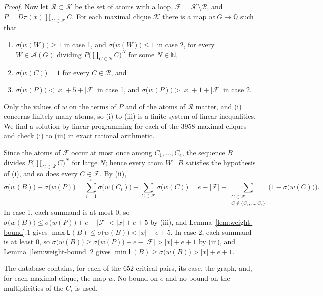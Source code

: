 \documentclass[a4paper, 10pt]{amsart}
\theoremstyle{plain}
\theoremstyle{definition}
\theoremstyle{definition}
\newcommand{\N}{\mathbb N}
\newcommand{\Q}{\mathbb Q}
\newcommand{\code}[1]{\texttt{\detokenize{#1}}}
\numberwithin{equation}{section}
\begin{document}
\begin{proof}
Now let $\mathcal R \subset \mathcal K$
be the set of atoms with a loop, $\mathcal F = \mathcal K \setminus \mathcal R$,
and $P = D\pi(x) \prod_{C \in \mathcal F} C$.  For each maximal clique
$\mathcal K$ there is a map $w \colon G \to \Q$ such that 
\begin{enumerate}
\item[(i)] $\sigma \big( w(W) \big) \ge 1$ in case 1, and $\sigma \big( w(W) \big) \le 1$ in case 2, for every
      $W \in \mathcal A (G)$ dividing $P \bigl(\prod_{C \in \mathcal R} C\bigr)^N$
      for some $N \in \N$,
\item[(ii)] $\sigma \big( w(C) \big) = 1$ for every $C \in \mathcal R$, and
\item[(iii)] $\sigma \big(w(P) \big) < |x|+5+|\mathcal F|$ in case 1, and
      $\sigma \big( w(P) \big) > |x|+1+|\mathcal F|$ in case 2.
\end{enumerate}
Only the values of $w$ on the terms of $P$ and of the atoms of $\mathcal R$
matter, and (i) concerns finitely many atoms, so (i) to (iii) is a finite
system of linear inequalities.  We find a solution by linear programming for
each of the $3958$ maximal cliques and check (i) to (iii) in exact rational
arithmetic.

Since the atoms of $\mathcal F$ occur at most once among
$C_1, \ldots, C_e$, the sequence $B$ divides
$P \bigl(\prod_{C \in \mathcal R} C\bigr)^N$ for large $N$; hence every atom
$W \mid B$ satisfies the hypothesis of (i), and so does every
$C \in \mathcal F$.  By (ii),
\[
 \sigma \big(w(B) \big)  - \sigma \big( w(P) \big)
 = \sum_{i=1}^{e} \sigma \big( w(C_i) \big) - \sum_{C \in \mathcal F} \sigma \big( w(C) \big)
 = e - |\mathcal F| + \sum_{\substack{C \in \mathcal F\\ C \notin \{C_1, \ldots, C_e\}}} \bigl(1 - \sigma \big( w(C) \big)\bigr) .
\]
In case 1, each summand is at most $0$, so
$\sigma \big( w(B) \big)  \le \sigma \big( w(P) \big) + e - |\mathcal F| < |x|+e+5$ by (iii), and 
Lemma~\ref{lem:weight-bound}.1 gives $\max \mathsf L (B) \le \sigma \big( w(B) \big) < |x|+e+5$.
In case 2, each summand is at least $0$, so
$\sigma \big( w(B) \big) \ge \sigma \big( w(P) \big) + e - |\mathcal F| > |x|+e+1$ by (iii), and 
Lemma~\ref{lem:weight-bound}.2 gives $\min \mathsf L (B) \ge \sigma \big( w(B) \big) > |x|+e+1$.

The database \code{extensions.jsonl} contains, for each of the $652$ critical
pairs, its case, the graph, and, for each maximal clique, the map $w$.  No
bound on $e$ and no bound on the multiplicities of the $C_i$ is used.
\end{proof}
\end{document}
